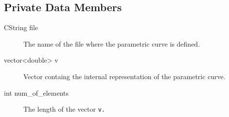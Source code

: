 \subsection{Private Data Members}
\begin{description}
 \item [CString file] The name of the file where the parametric curve
                      is defined.
 \item [vector<double> v] Vector containg the internal representation of the
                          parametric curve. 
 \item [int num\_of\_elements]  The length of the vector \tt v\rm.
\end{description}
